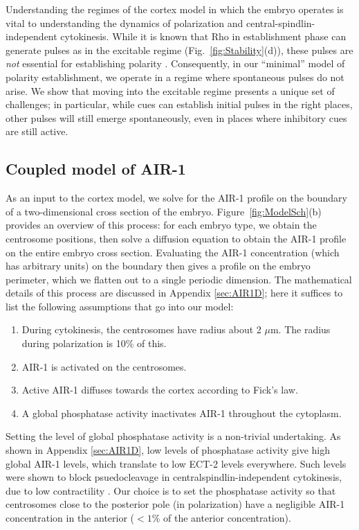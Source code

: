 \documentclass[11pt]{article}
\begin{document}
Understanding the regimes of the cortex model in which the embryo operates is vital to understanding the dynamics of polarization and central-spindlin-independent cytokinesis. While it is known that Rho in establishment phase can generate pulses as in the excitable regime (Fig.\ \ref{fig:Stability}(d)), these pulses are \emph{not} essential for establishing polarity \cite[Fig.~7]{michaux2018excitable}. Consequently, in our ``minimal'' model of polarity establishment, we operate in a regime where spontaneous pulses do not arise. We show that moving into the excitable regime presents a unique set of challenges; in particular, while cues can establish initial pulses in the right places, other pulses will still emerge spontaneously, even in places where inhibitory cues are still active.


\subsection{Coupled model of AIR-1}
As an input to the cortex model, we solve for the AIR-1 profile on the boundary of a two-dimensional cross section of the embryo. Figure\ \ref{fig:ModelSch}(b) provides an overview of this process: for each embryo type, we obtain the centrosome positions, then solve a diffusion equation to obtain the AIR-1 profile on the entire embryo cross section. Evaluating the AIR-1 concentration (which has arbitrary units) on the boundary then gives a profile on the embryo perimeter, which we flatten out to a single periodic dimension. The mathematical details of this process are discussed in Appendix \ref{sec:AIR1D}; here it suffices to list the following assumptions that go into our model:
\begin{enumerate}
\item During cytokinesis, the centrosomes have radius about 2 $\mu$m. The radius during polarization is 10\% of this.
\item AIR-1 is activated on the centrosomes.
\item Active AIR-1 diffuses towards the cortex according to Fick's law.
\item A global phosphatase activity inactivates AIR-1 throughout the cytoplasm. 
\end{enumerate}
Setting the level of global phosphatase activity is a non-trivial undertaking. As shown in Appendix \ref{sec:AIR1D}, low levels of phosphatase activity give high global AIR-1 levels, which translate to low ECT-2 levels everywhere. Such levels were shown to block psuedocleavage in centralspindlin-independent cytokinesis, due to low contractility \citep{afshar2010regulation, kotak2016aurora}. Our choice is to set the phosphatase activity so that centrosomes close to the posterior pole (in polarization) have a negligible AIR-1 concentration in the anterior ($< 1\%$ of the anterior concentration).
\end{document}
